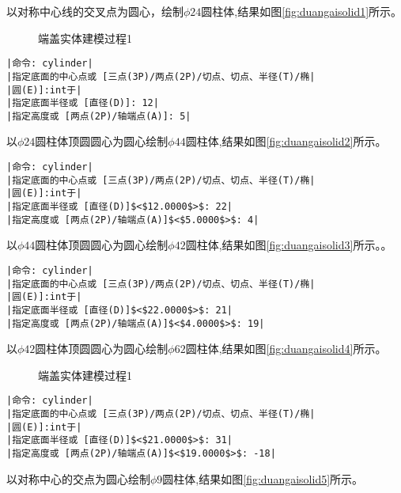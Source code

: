 \begin{procedure}
以对称中心线的交叉点为圆心，绘制$\phi 24$圆柱体,结果如图\ref{fig:duangaisolid1}所示。
\begin{figure}[htbp]
\centering
{}\hspace{30pt}
\hspace{30pt}
\caption{端盖实体建模过程1}
\end{figure}
\begin{lstlisting}
|命令: cylinder|
|指定底面的中心点或 [三点(3P)/两点(2P)/切点、切点、半径(T)/椭|
|圆(E)]:int于|
|指定底面半径或 [直径(D)]: 12|
|指定高度或 [两点(2P)/轴端点(A)]: 5|
\end{lstlisting}
以$\phi 24$圆柱体顶圆圆心为圆心绘制$\phi 44$圆柱体,结果如图\ref{fig:duangaisolid2}所示。
\begin{lstlisting}
|命令: cylinder|
|指定底面的中心点或 [三点(3P)/两点(2P)/切点、切点、半径(T)/椭|
|圆(E)]:int于|
|指定底面半径或 [直径(D)]$<$12.0000$>$: 22|
|指定高度或 [两点(2P)/轴端点(A)]$<$5.0000$>$: 4|
\end{lstlisting}
以$\phi 44$圆柱体顶圆圆心为圆心绘制$\phi 42$圆柱体,结果如图\ref{fig:duangaisolid3}所示。。
\begin{lstlisting}
|命令: cylinder|
|指定底面的中心点或 [三点(3P)/两点(2P)/切点、切点、半径(T)/椭|
|圆(E)]:int于|
|指定底面半径或 [直径(D)]$<$22.0000$>$: 21|
|指定高度或 [两点(2P)/轴端点(A)]$<$4.0000$>$: 19|
\end{lstlisting}
以$\phi 42$圆柱体顶圆圆心为圆心绘制$\phi 62$圆柱体,结果如图\ref{fig:duangaisolid4}所示。
\begin{figure}[htbp]
\centering
{}\hspace{30pt}
\hspace{30pt}
\caption{端盖实体建模过程1}
\end{figure}
\begin{lstlisting}
|命令: cylinder|
|指定底面的中心点或 [三点(3P)/两点(2P)/切点、切点、半径(T)/椭|
|圆(E)]:int于|
|指定底面半径或 [直径(D)]$<$21.0000$>$: 31|
|指定高度或 [两点(2P)/轴端点(A)]$<$19.0000$>$: -18|
\end{lstlisting}
以对称中心的交点为圆心绘制$\phi 9$圆柱体,结果如图\ref{fig:duangaisolid5}所示。

\end{procedure}
